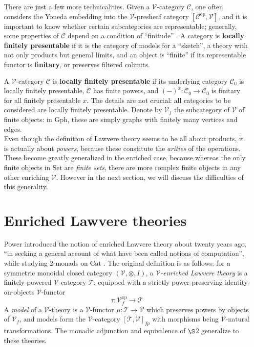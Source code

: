 \documentclass{amsart}
\theoremstyle{definition}
\newcommand{\Gph}{\mathrm{Gph}}
\newcommand{\Set}{\mathrm{Set}}
\newcommand{\Cat}{\mathrm{Cat}}
\newcommand{\op}{\mathrm{op}}
\newcommand{\V}{\mathscr{V}}
\newcommand{\C}{\mathscr{C}}
\newcommand{\T}{\mathscr{T}}
\newcommand{\maps}{\colon}
\begin{document}
There are just a few more technicalities. Given a $\V$-category $\C$, one often considers the Yoneda embedding into the $\V$-presheaf category $[\C^\op, \V]$, and it is important to know whether certain subcategories are representable; generally, some properties of $\C$ depend on a condition of ``finitude'' \cite{finite}. A category is \textbf{locally finitely presentable} if it is the category of models for a ``sketch'', a theory with not only products but general limits, and an object is ``finite'' if its representable functor is \textbf{finitary}, or preserves filtered colimits.

A $\V$-category $\C$ is \textbf{locally finitely presentable} if its underlying category $\C_0$ is locally finitely presentable, $\C$ has finite powers, and $(-)^x\maps \C_0 \to \C_0$ is finitary for all finitely presentable $x$. The details are not crucial: all categories to be considered are locally finitely presentable. Denote by $\V_f$ the subcategory of $\V$ of finite objects: in $\Gph$, these are simply graphs with finitely many vertices and edges.\\

Even though the definition of Lawvere theory seems to be all about products, it is actually about \textit{powers}, because these constitute the \textit{arities} of the operations. These become greatly generalized in the enriched case, because whereas the only finite objects in $\Set$ are \textit{finite sets}, there are more complex finite objects in any other enriching $\V$. However in the next section, we will discuss the difficulties of this generality.

\section{Enriched Lawvere theories}
Power introduced the notion of enriched Lawvere theory about twenty years ago, ``in seeking a general account of what have been called notions of computation'', while studying 2-monads on $\Cat$ \cite{power}. The original definition is as follows: for a symmetric monoidal closed category $(\V,\otimes,I)$, a \textit{$\V$-enriched Lawvere theory} is a finitely-powered $\V$-category $\T$, equipped with a strictly power-preserving identity-on-objects $\V$-functor $$\tau\maps\V_f^\op \to \T$$ A \textit{model} of a $\V$-theory is a $\V$-functor $\mu\maps\T \to \V$ which preserves powers by objects of $\V_f$, and models form the $\V$-category $[\T,\V]_{fp}$ with morphisms being $\V$-natural transformations. The monadic adjunction and equivalence of $\S$2 generalize to these theories.
\end{document}
